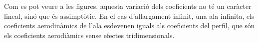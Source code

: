 Com es pot veure a les figures, aquesta variació dels coeficients no té un caràcter lineal, sinó que és assimptòtic. En el cas d'allargament infinit, una ala infinita, els coeficients aerodinàmics de l'ala esdevenen iguals als coeficients del perfil, que són els coeficients aerodiàmics sense efectes tridimensionals.